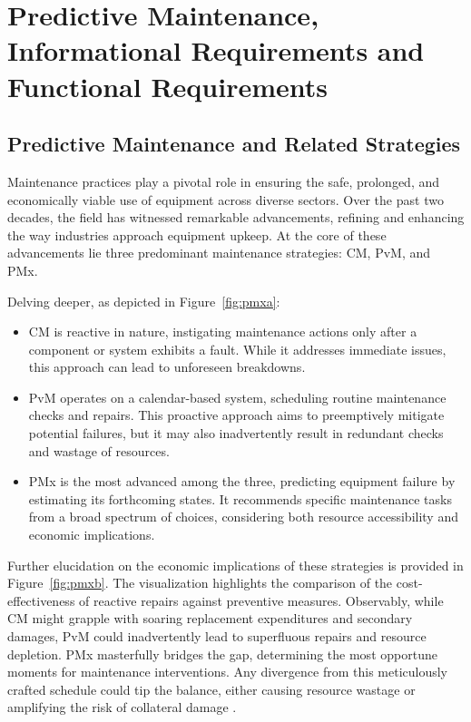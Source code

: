 \documentclass[runningheads]{llncs}
\begin{document}
\section{Predictive Maintenance, Informational Requirements and Functional Requirements} 
\label{sec:IRFR}
\subsection{Predictive Maintenance and Related Strategies}
\label{subsec:module}

Maintenance practices play a pivotal role in ensuring the safe, prolonged, and economically viable use of equipment across diverse sectors. Over the past two decades, the field has witnessed remarkable advancements, refining and enhancing the way industries approach equipment upkeep. At the core of these advancements lie three predominant maintenance strategies: CM, PvM, and PMx.

Delving deeper, as depicted in Figure~\ref{fig:pmxa}:
\begin{itemize}
    \item CM is reactive in nature, instigating maintenance actions only after a component or system exhibits a fault. While it addresses immediate issues, this approach can lead to unforeseen breakdowns.

    \item PvM operates on a calendar-based system, scheduling routine maintenance checks and repairs. This proactive approach aims to preemptively mitigate potential failures, but it may also inadvertently result in redundant checks and wastage of resources.

    \item PMx is the most advanced among the three, predicting equipment failure by estimating its forthcoming states. It recommends specific maintenance tasks from a broad spectrum of choices, considering both resource accessibility and economic implications.
\end{itemize}

Further elucidation on the economic implications of these strategies is provided in Figure~\ref{fig:pmxb}. The visualization highlights the comparison of the cost-effectiveness of reactive repairs against preventive measures. Observably, while CM might grapple with soaring replacement expenditures and secondary damages, PvM could inadvertently lead to superfluous repairs and resource depletion. PMx masterfully bridges the gap, determining the most opportune moments for maintenance interventions. Any divergence from this meticulously crafted schedule could tip the balance, either causing resource wastage or amplifying the risk of collateral damage \cite{jimenez2019system}.
\end{document}
